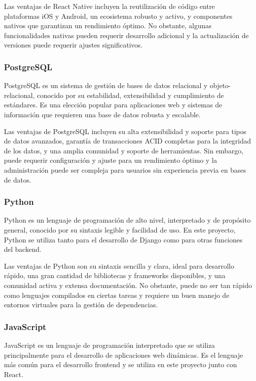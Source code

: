 Las ventajas de React Native incluyen la reutilización de código entre plataformas iOS y Android, un ecosistema robusto y activo, y componentes nativos que garantizan un rendimiento óptimo. No obstante, algunas funcionalidades nativas pueden requerir desarrollo adicional y la actualización de versiones puede requerir ajustes significativos.

\subsubsection{PostgreSQL}

PostgreSQL es un sistema de gestión de bases de datos relacional y objeto-relacional, conocido por su estabilidad, extensibilidad y cumplimiento de estándares. Es una elección popular para aplicaciones web y sistemas de información que requieren una base de datos robusta y escalable.

Las ventajas de PostgreSQL incluyen su alta extensibilidad y soporte para tipos de datos avanzados, garantía de transacciones ACID completas para la integridad de los datos, y una amplia comunidad y soporte de herramientas. Sin embargo, puede requerir configuración y ajuste para un rendimiento óptimo y la administración puede ser compleja para usuarios sin experiencia previa en bases de datos.

\subsubsection{Python}

Python es un lenguaje de programación de alto nivel, interpretado y de propósito general, conocido por su sintaxis legible y facilidad de uso. En este proyecto, Python se utiliza tanto para el desarrollo de Django como para otras funciones del backend.

Las ventajas de Python son su sintaxis sencilla y clara, ideal para desarrollo rápido, una gran cantidad de bibliotecas y frameworks disponibles, y una comunidad activa y extensa documentación. No obstante, puede no ser tan rápido como lenguajes compilados en ciertas tareas y requiere un buen manejo de entornos virtuales para la gestión de dependencias.

\subsubsection{JavaScript}

JavaScript es un lenguaje de programación interpretado que se utiliza principalmente para el desarrollo de aplicaciones web dinámicas. Es el lenguaje más común para el desarrollo frontend y se utiliza en este proyecto junto con React.

